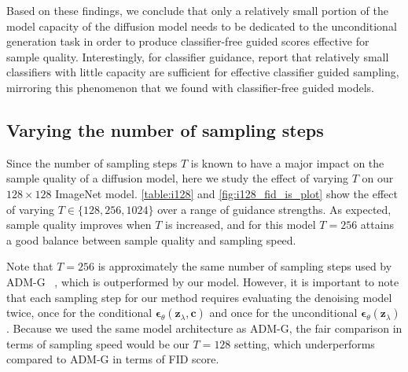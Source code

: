 \documentclass{article} %
\newcommand{\bc}{\mathbf{c}}
\newcommand{\bz}{\mathbf{z}}
\newcommand{\bepsilon}{{\boldsymbol{\epsilon}}}
\begin{document}
Based on these findings, we conclude that only a relatively small portion of the model capacity of the diffusion model needs to be dedicated to the unconditional generation task in order to produce classifier-free guided scores effective for sample quality. Interestingly, for classifier guidance, \citeauthor{dhariwal2021diffusion} report that relatively small classifiers with little capacity are sufficient for effective classifier guided sampling, mirroring this phenomenon that we found with classifier-free guided models.



\subsection{Varying the number of sampling steps}

Since the number of sampling steps $T$ is known to have a major impact on the sample quality of a diffusion model, here we study the effect of varying $T$ on our $128\times128$ ImageNet model. \cref{table:i128} and \cref{fig:i128_fid_is_plot} show the effect of varying $T\in\{128,256,1024\}$ over a range of guidance strengths. As expected, sample quality improves when $T$ is increased, and for this model $T=256$ attains a good balance between sample quality and sampling speed.

Note that $T=256$ is approximately the same number of sampling steps used by ADM-G ~\citep{dhariwal2021diffusion}, which is outperformed by our model. However, it is important to note that each sampling step for our method requires evaluating the denoising model twice, once for the conditional $\bepsilon_\theta(\bz_\lambda,\bc)$ and once for the unconditional $\bepsilon_\theta(\bz_\lambda)$. Because we used the same model architecture as ADM-G, the fair comparison in terms of sampling speed would be our $T=128$ setting, which underperforms compared to ADM-G in terms of FID score.
\end{document}
